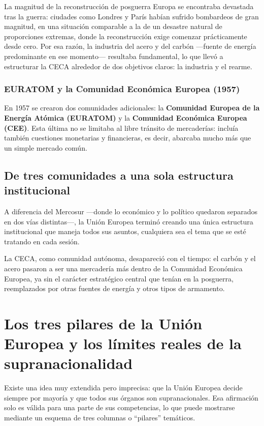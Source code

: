 \documentclass[12pt,oneside]{book}
\begin{document}
\begin{example}{La magnitud de la reconstrucción de posguerra}
Europa se encontraba devastada tras la guerra: ciudades como Londres y París habían sufrido bombardeos de gran magnitud, en una situación comparable a la de un desastre natural de proporciones extremas, donde la reconstrucción exige comenzar prácticamente desde cero. Por esa razón, la industria del acero y del carbón —fuente de energía predominante en ese momento— resultaba fundamental, lo que llevó a estructurar la CECA alrededor de dos objetivos claros: la industria y el rearme.
\end{example}

\subsubsection{EURATOM y la Comunidad Económica Europea (1957)}

En 1957 se crearon dos comunidades adicionales: la \textbf{Comunidad Europea de la Energía Atómica (EURATOM)} y la \textbf{Comunidad Económica Europea (CEE)}. Esta última no se limitaba al libre tránsito de mercaderías: incluía también cuestiones monetarias y financieras, es decir, abarcaba mucho más que un simple mercado común.

\subsection{De tres comunidades a una sola estructura institucional}

A diferencia del Mercosur —donde lo económico y lo político quedaron separados en dos vías distintas—, la Unión Europea terminó creando una única estructura institucional que maneja todos sus asuntos, cualquiera sea el tema que se esté tratando en cada sesión.

La CECA, como comunidad autónoma, desapareció con el tiempo: el carbón y el acero pasaron a ser una mercadería más dentro de la Comunidad Económica Europea, ya sin el carácter estratégico central que tenían en la posguerra, reemplazados por otras fuentes de energía y otros tipos de armamento.

\section{Los tres pilares de la Unión Europea y los límites reales de la supranacionalidad}

Existe una idea muy extendida pero imprecisa: que la Unión Europea decide siempre por mayoría y que todos sus órganos son supranacionales. Esa afirmación solo es válida para una parte de sus competencias, lo que puede mostrarse mediante un esquema de tres columnas o ``pilares'' temáticos.
\end{document}
